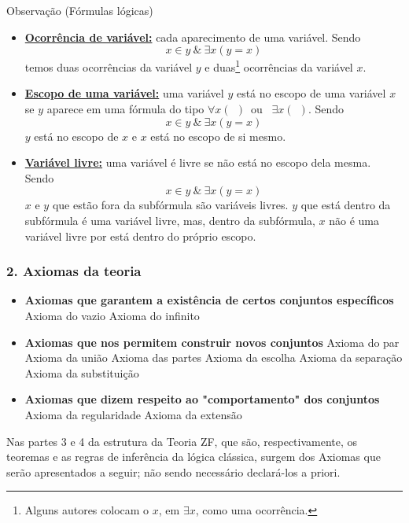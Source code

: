 \begin{mymdframed}{Observação (Fórmulas lógicas)}
    \begin{itemize}
        \item\textbf{\underline{Ocorrência de variável:}} cada aparecimento de uma variável.
            Sendo $$x \in y\ \&\ \exists x (y = x)$$
            temos duas ocorrências da variável $y$ e duas\footnote[1]{Alguns autores colocam o $x$, em $\exists x$, como uma ocorrência.} ocorrências da variável $x$.
        \item \textbf{\underline{Escopo de uma variável:}} uma variável $y$ está no escopo de uma variável $x$ se $y$ aparece em uma fórmula do tipo $\forall x (\ \ )$\ ou \ $\exists x (\ \ )$.
            Sendo $$x \in y\ \& \ \exists x (y = x)$$
            $y$ está no escopo de $x$ e $x$ está no escopo de si mesmo.
        \item \textbf{\underline{Variável livre:}} uma variável é livre se não está no escopo dela mesma.
            Sendo $$x \in y\ \& \ \exists x (y = x)$$
            $x$ e $y$ que estão fora da subfórmula são variáveis livres. $y$ que está dentro da subfórmula é uma variável livre, mas, dentro da subfórmula, $x$ não é uma variável livre por está dentro do próprio escopo.
    \end{itemize}
\end{mymdframed}
\subsubsection*{2. Axiomas da teoria}  
\begin{itemize}
    \item \textbf{Axiomas que garantem a existência de certos conjuntos específicos}
        \subitem Axioma do vazio
        \subitem Axioma do infinito    
    \item \textbf{Axiomas que nos permitem construir novos conjuntos}
        \subitem Axioma do par
        \subitem Axioma da união
        \subitem Axioma das partes
        \subitem Axioma da escolha
        \subitem Axioma da separação
        \subitem Axioma da substituição
    \item \textbf{Axiomas que dizem respeito ao "comportamento" dos conjuntos}
        \subitem Axioma da regularidade 
        \subitem Axioma da extensão
\end{itemize}
Nas partes 3 e 4 da estrutura da Teoria ZF, que são, respectivamente, os teoremas e as regras de inferência da lógica clássica, surgem dos Axiomas que serão apresentados a seguir; não sendo necessário declará-los a priori.


